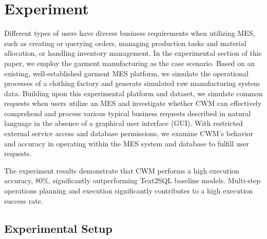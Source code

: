 \documentclass[preprint,12pt]{elsarticle}
\begin{document}
\section{Experiment}
\label{sec:exp}
Different types of users have diverse business requirements when utilizing MES, such as creating or querying orders, managing production tasks and material allocation, or handling inventory management. 
In the experimental section of this paper, we employ the garment manufacturing as the case scenario. 
Based on an existing, well-established garment MES platform, we simulate the operational processes of a clothing factory and generate simulated raw manufacturing system data. 
Building upon this experimental platform and dataset, we simulate common requests when users utilize an MES and investigate whether CWM can effectively comprehend and process various typical business requests described in natural language in the absence of a graphical user interface (GUI). 
With restricted external service access and database permissions, we examine CWM's behavior and accuracy in operating within the MES system and database to fulfill user requests.

The experiment results demonstrate that CWM performs a high execution accuracy, 80\%, significantly outperforming Text2SQL baseline models. 
Multi-step operations planning and execution significantly contributes to a high execution success rate.
\subsection{Experimental Setup}

\end{document}
